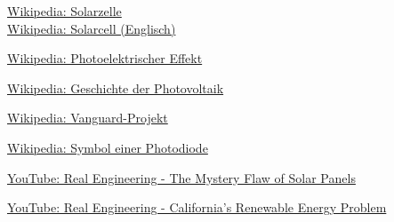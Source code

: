 \newpage
\begin{thebibliography}{9}
        \href{https://de.wikipedia.org/wiki/Solarzelle}{
            Wikipedia: Solarzelle
        }\\
        \href{https://en.wikipedia.org/wiki/Solar_cell}{
            Wikipedia: Solarcell (Englisch)
        }

        \href{https://de.wikipedia.org/wiki/Photoelektrischer_Effekt}{
            Wikipedia: Photoelektrischer Effekt
        }

        \href{https://de.wikipedia.org/wiki/Geschichte_der_Photovoltaik}{
            Wikipedia: Geschichte der Photovoltaik
        }

        \href{https://de.wikipedia.org/wiki/Vanguard-Projekt}{
            Wikipedia: Vanguard-Projekt
        }

        \href{https://de.wikipedia.org/wiki/Datei:Symbol_Photodiode.svg}{
            Wikipedia: Symbol einer Photodiode
        }

        \href{https://www.youtube.com/watch?v=yVOnHWnLSeU}{
            YouTube: Real Engineering - The Mystery Flaw of Solar Panels
        }

        \href{https://www.youtube.com/watch?v=h5cm7HOAqZY}{
            YouTube: Real Engineering - California's Renewable Energy Problem
        }
\end{thebibliography}